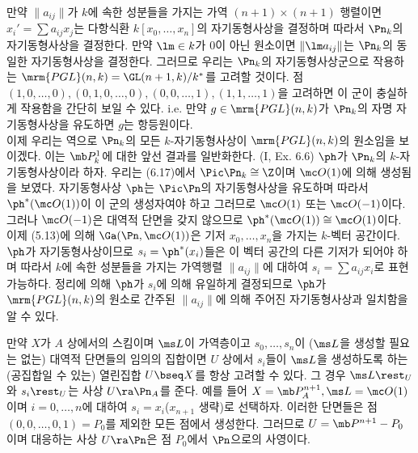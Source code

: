 	
	\begin{example}
	만약 $\|a_{ij}\|$가 $k$에 속한 성분들을 가지는 가역 $(n+1)\times(n+1)$ 행렬이면
	$x_i'=\sum a_{ij}x_j$는 다항식환 $k[x_0,\ldots,x_n]$의 자기동형사상을 결정하며 따라서 $\Pn_k$의 자기동형사상을 결정한다.
	만약 $\lm\in k$가 0이 아닌 원소이면 $\|\lm a_{ij}\|$는 $\Pn_k$의 동일한 자기동형사상을 결정한다.
	그러므로 우리는 $\Pn_k$의 자기동형사상군으로 작용하는 $\mrm{PGL}(n,k)=\GL(n+1,k)/k^*$를 고려할 것이다.
	점 $(1,0,\ldots,0),(0,1,0,\ldots,0),(0,0,\ldots,1),(1,1,\ldots,1)$을 고려하면 이 군이 충실하게 작용함을 간단히 보일 수 있다.
	i.e. 만약 $g\in\mrm{PGL}(n,k)$가 $\Pn_k$의 자명 자기동형사상을 유도하면 $g$는 항등원이다.\\
	이제 우리는 역으로 $\Pn_k$의 모든 $k$-자기동형사상이 $\mrm{PGL}(n,k)$의 원소임을 보이겠다.
	이는 $\mb P^1_k$에 대한 앞선 결과를 일반화한다. (I, Ex. 6.6)
	$\ph$가 $\Pn_k$의 $k$-자기동형사상이라 하자. 우리는 (6.17)에서 $\Pic\Pn_k\cong\Z$이며 $\mc O(1)$에 의해 생성됨을 보였다.
	자기동형사상 $\ph$는 $\Pic\Pn$의 자기동형사상을 유도하며 따라서 $\ph^*(\mc O(1))$이 이 군의 생성자여야 하고
	그러므로 $\mc O(1)$ 또는 $\mc O(-1)$이다.
	그러나 $\mc O(-1)$은 대역적 단면을 갖지 않으므로 $\ph^*(\mc O(1))\cong\mc O(1)$이다.
	이제 (5.13)에 의해 $\Ga(\Pn,\mc O(1))$은 기저 $x_0,\ldots,x_n$을 가지는 $k$-벡터 공간이다.
	$\ph$가 자기동형사상이므로 $s_i=\ph^*(x_i)$들은 이 벡터 공간의 다른 기저가 되어야 하며
	따라서 $k$에 속한 성분들을 가지는 가역행렬 $\|a_{ij}\|$에 대하여 $s_i=\sum a_{ij}x_i$로 표현 가능하다.
	정리에 의해 $\ph$가 $s_i$에 의해 유일하게 결정되므로
	$\ph$가 $\mrm{PGL}(n,k)$의 원소로 간주된 $\|a_{ij}\|$에 의해 주어진 자기동형사상과 일치함을 알 수 있다.
	\end{example}
	
	
	\begin{example}
	만약 $X$가 $A$ 상에서의 스킴이며 $\ms L$이 가역층이고
	$s_0,\ldots,s_n$이 ($\ms L$을 생성할 필요는 없는) 대역적 단면들의 임의의 집합이면
	$U$ 상에서 $s_i$들이 $\ms L$을 생성하도록 하는 (공집합일 수 있는) 열린집합 $U\bseq X$를 항상 고려할 수 있다.
	그 경우 $\ms L\rest_U$와 $s_i\rest_U$는 사상 $U\ra\Pn_A$를 준다.
	예를 들어 $X=\mb P^{n+1}_A,\ms L=\mc O(1)$이며 $i=0,\ldots,n$에 대하여 $s_i=x_i$($x_{n+1}$ 생략)로 선택하자.
	이러한 단면들은 점 $(0,0,\ldots,0,1)=P_0$를 제외한 모든 점에서 생성한다. 그러므로 $U=\mb P^{n+1}-P_0$이며
	대응하는 사상 $U\ra\Pn$은 점 $P_0$에서 $\Pn$으로의 사영이다.
	\end{example}
	
